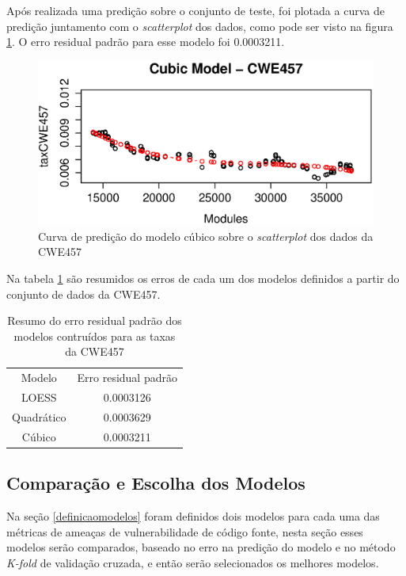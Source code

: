 Após realizada uma predição sobre o conjunto de teste, foi plotada a curva de
predição juntamento com o \textit{scatterplot} dos dados, como pode ser visto na
figura \ref{fig:cwe457-cubic}. O erro residual padrão para esse modelo foi
0.0003211.

\begin{figure}[h]
  \centering
  \includegraphics[width=1.0\textwidth]
      {figuras/cwe457-cubic.eps}
      \caption{Curva de predição do modelo cúbico sobre o \textit{scatterplot}
      dos dados da CWE457}
  \label{fig:cwe457-cubic}
\end{figure}

Na tabela \ref{tab:cwe457-erros} são resumidos os erros de cada um dos modelos
definidos a partir do conjunto de dados da CWE457.

\begin{table}[h]
 \centering
 \begin{tabular}{cc}
  \rowcolor[HTML]{EFEFEF} 
  {Modelo} & {Erro residual padrão} \\
  {LOESS}  & 0.0003126                  \\
  Quadrático   & 0.0003629                  \\
  Cúbico       & 0.0003211                 
 \end{tabular}
 \caption{Resumo do erro residual padrão dos modelos contruídos para as taxas da
 CWE457}
 \label{tab:cwe457-erros}
\end{table}

\subsection{Comparação e Escolha dos Modelos}\label{comparacaomodelos}

Na seção \ref{definicaomodelos} foram definidos dois modelos para cada uma das
métricas de ameaças de vulnerabilidade de código fonte, nesta seção esses
modelos serão comparados, baseado no erro na predição do modelo e no método
\textit{K-fold} de validação cruzada, e então serão selecionados os melhores
modelos.

